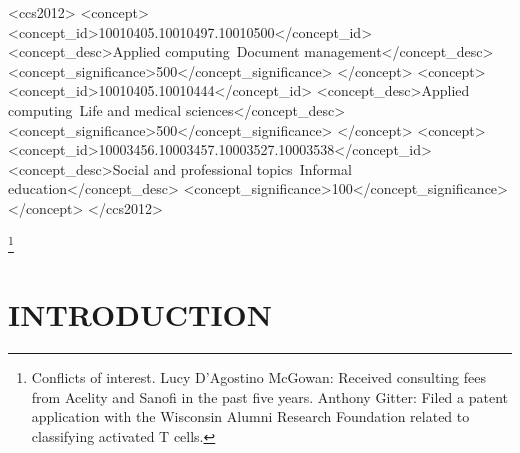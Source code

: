 \documentclass[sigconf]{acmart}
\begin{document}
\hypertarget{ccs-concepts}{%
\label{ccs-concepts}}

\begin{CCSXML}
<ccs2012>
   <concept>
       <concept_id>10010405.10010497.10010500</concept_id>
       <concept_desc>Applied computing~Document management</concept_desc>
       <concept_significance>500</concept_significance>
       </concept>
   <concept>
       <concept_id>10010405.10010444</concept_id>
       <concept_desc>Applied computing~Life and medical sciences</concept_desc>
       <concept_significance>500</concept_significance>
       </concept>
   <concept>
       <concept_id>10003456.10003457.10003527.10003538</concept_id>
       <concept_desc>Social and professional topics~Informal education</concept_desc>
       <concept_significance>100</concept_significance>
       </concept>
 </ccs2012>
\end{CCSXML}


\hypertarget{keywords}{%
\label{keywords}}


\maketitle

	{\let\thefootnote\relax\footnote{Conflicts of interest. Lucy D'Agostino McGowan: Received consulting fees from Acelity and Sanofi in the past five years. Anthony Gitter: Filed a patent application with the Wisconsin Alumni Research Foundation related to classifying activated T cells.}}

\hypertarget{introduction}{%
\section{INTRODUCTION}\label{introduction}}
\end{document}
